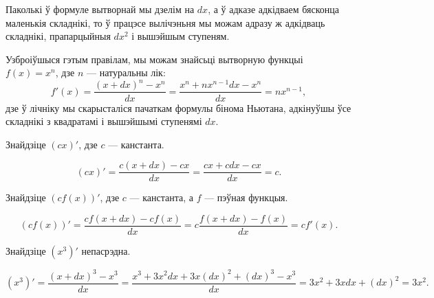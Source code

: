 \documentclass[10pt,a4paper]{book}
\theoremstyle{plain}
\begin{document}
Паколькі ў формуле вытворнай мы дзелім на $dx$, а ў адказе адкідваем бясконца
маленькія складнікі, то ў працэсе вылічэньня мы можам адразу ж адкідваць
складнікі, прапарцыйныя $dx^2$ і вышэйшым ступеням.

Узброіўшыся гэтым правілам, мы можам знайсьці вытворную функцыі $f(x) = x^n$,
дзе $n$ --- натуральны лік:
\begin{equation*}
  f'(x) = \frac{(x+dx)^n - x^n}{dx} = \frac{x^n + nx^{n-1}dx - x^n}{dx} = nx^{n-1},
\end{equation*}
дзе ў лічніку мы скарысталіся пачаткам формулы бінома Ньютана, адкінуўшы ўсе
складнікі з квадратамі і вышэйшымі ступенямі $dx$.

\begin{exercise}
  Знайдзіце $(cx)'$, дзе $c$ --- канстанта.
\end{exercise}
\begin{solution}
  \begin{equation*}
    (cx)' = \frac{c(x+dx) - cx}{dx} = \frac{cx + cdx - cx}{dx} = c.
  \end{equation*}
\end{solution}

\begin{exercise}
  Знайдзіце $(cf(x))'$, дзе $c$ --- канстанта, а $f$ --- пэўная функцыя.
\end{exercise}
\begin{solution}
  \begin{equation*}
    (cf(x))' = \frac{cf(x+dx) - cf(x)}{dx} = c\frac{f(x + dx) - f(x)}{dx} =
    cf'(x).
  \end{equation*}
\end{solution}

\begin{exercise}
  Знайдзіце $(x^3)'$ непасрэдна.
\end{exercise}
\begin{solution}
  \begin{equation*}
    (x^3)' = \frac{(x+dx)^3 - x^3}{dx} = \frac{x^3 + 3x^2dx + 3x (dx)^2 + (dx)^3
      - x^3}{dx} = 3x^2 + 3x dx + (dx)^2 = 3x^2.
  \end{equation*}
\end{solution}
\end{document}
